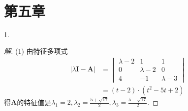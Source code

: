 \documentclass[10pt,a4paper]{report}
\title{}
\author{}
\date{}
\def\*#1{\mathbf{#1}}
\begin{document}
\chapter*{第五章}
1.
\begin{proof}[解]
	(1) 由特征多项式
	\begin{align*}
	|\lambda \*I - \*A | &= \begin{vmatrix}
	\lambda -2 & 1 & 1 \\
	0 & \lambda -2 & 0 \\
	4 & -1 & \lambda -3
	\end{vmatrix} \\
	&= (t - 2) \cdot (t^{2} - 5t + 2)
	\end{align*}
	得$\*A$的特征值是$\lambda_1 = 2, \lambda_2 = \frac{5+\sqrt{17}}{2}, \lambda_3 = \frac{5 - \sqrt{17}}{2}$.
	

\end{proof}
\end{document}
